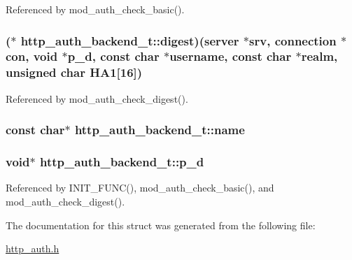 Referenced by mod\-\_\-auth\-\_\-check\-\_\-basic().

\hypertarget{structhttp__auth__backend__t_a21f07bcb98ee7882ba72eee5f39c5ec2}{
\subsubsection[{digest}]{($\ast$ http\-\_\-auth\-\_\-backend\-\_\-t\-::digest)({\bf server} $\ast$srv, {\bf connection} $\ast$con, void $\ast${\bf p\-\_\-d}, const char $\ast$username, const char $\ast$realm, unsigned char H\-A1\mbox{[}16\mbox{]})}}\label{structhttp__auth__backend__t_a21f07bcb98ee7882ba72eee5f39c5ec2}


Referenced by mod\-\_\-auth\-\_\-check\-\_\-digest().

\hypertarget{structhttp__auth__backend__t_aeceb871ba2cee49a52821a1de64a8cf2}{
\subsubsection[{name}]{\setlength{\rightskip}{0pt plus 5cm}const char$\ast$ http\-\_\-auth\-\_\-backend\-\_\-t\-::name}}\label{structhttp__auth__backend__t_aeceb871ba2cee49a52821a1de64a8cf2}
\hypertarget{structhttp__auth__backend__t_a42f4f2b138df39db0fd46c31dbfe3bfd}{
\subsubsection[{p\-\_\-d}]{\setlength{\rightskip}{0pt plus 5cm}void$\ast$ http\-\_\-auth\-\_\-backend\-\_\-t\-::p\-\_\-d}}\label{structhttp__auth__backend__t_a42f4f2b138df39db0fd46c31dbfe3bfd}


Referenced by I\-N\-I\-T\-\_\-\-F\-U\-N\-C(), mod\-\_\-auth\-\_\-check\-\_\-basic(), and mod\-\_\-auth\-\_\-check\-\_\-digest().



The documentation for this struct was generated from the following file\-:\begin{DoxyCompactItemize}
\item 
\hyperlink{http__auth_8h}{http\-\_\-auth.\-h}\end{DoxyCompactItemize}

